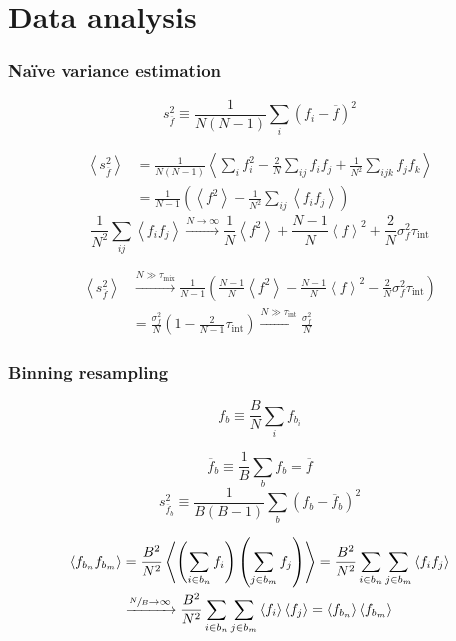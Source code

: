 \chapter{Data analysis}\label{ap:data}

\subsection*{Na\"ive variance estimation}
\[
    s_{\overline f}^2 \equiv \frac{1}{N(N-1)}\sum_i\left(f_i-\overline f\right)^2
\]

\[\begin{aligned}
    \left<s_{\overline f}^2\right> &= \frac{1}{N(N-1)}\left<\sum_if_i^2-\frac{2}{N}\sum_{ij}f_if_j+\frac{1}{N^2}\sum_{ijk}f_jf_k\right> \\
                                   &= \frac{1}{N-1}\left(\left<f^2\right>-\frac{1}{N^2}\sum_{ij}\left<f_if_j\right>\right)
\end{aligned}\]
\[
    \frac{1}{N^2}\sum_{ij}\left<f_if_j\right> \xrightarrow{N\to\infty}\frac{1}{N}\left<f^2\right> + \frac{N-1}{N}\left<f\right>^2+\frac{2}{N}\sigma_f^2\tau_\mathrm{int}
\]

\[\begin{aligned}
    \left<s_{\overline f}^2\right> &\xrightarrow{N\gg\tau_\mathrm{mix}}
                                     \frac{1}{N-1}\left(\frac{N-1}{N}\left<f^2\right>-\frac{N-1}{N}\left<f\right>^2-\frac{2}{N}\sigma_f^2\tau_\mathrm{int}\right) \\
                                   &= \frac{\sigma_f^2}{N}\left(1-\frac{2}{N-1}\tau_\mathrm{int}\right) \xrightarrow{N\gg\tau_\mathrm{int}} \frac{\sigma_f^2}{N}
\end{aligned}\]

\subsection*{Binning resampling}

\[
    f_b \equiv \frac{B}{N}\sum_i f_{b_i}
\]

\[
    \overline f_b \equiv \frac{1}{B} \sum_b f_b = \overline f
\]
\[
    s_{\overline f_b}^2 \equiv \frac{1}{B(B-1)}\sum_b \left(f_b - \overline f_b\right)^2
\]

\[\begin{aligned}
    \left<f_{b_n}f_{b_m}\right> &= \frac{B^2}{N^2}\left<\left(\sum_{i\in b_n} f_i\right)\left(\sum_{j\in b_m}f_j\right)\right> 
                                = \frac{B^2}{N^2}\sum_{i\in b_n} \sum_{j\in b_m} \left<f_i f_j\right> \\
                                &\xrightarrow{\sfrac{N}{B}\to\infty} \frac{B^2}{N^2}\sum_{i\in b_n} \sum_{j\in b_m} \left<f_i\right> \left<f_j\right> 
                                = \left<f_{b_n}\right>\left<f_{b_m}\right>
\end{aligned}\]

